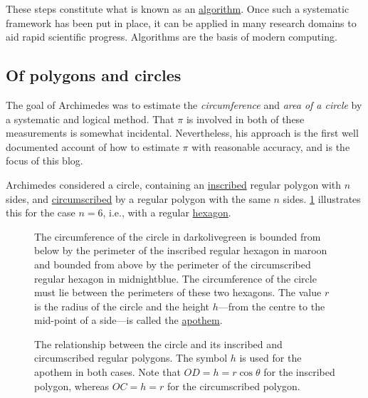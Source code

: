 \documentclass[
  a4paper,
]{article}
\begin{document}
These steps constitute what is known as an
\href{https://www.merriam-webster.com/dictionary/algorithm}{algorithm}.
Once such a systematic framework has been put in place, it can be
applied in many research domains to aid rapid scientific progress.
Algorithms are the basis of modern computing.

\subsection{Of polygons and circles}\label{of-polygons-and-circles}

The goal of Archimedes was to estimate the \emph{circumference} and
\emph{area of a circle} by a systematic and logical method. That \(\pi\)
is involved in both of these measurements is somewhat incidental.
Nevertheless, his approach is the first well documented account of how
to estimate \(\pi\) with reasonable accuracy, and is the focus of this
blog.

Archimedes considered a circle, containing an
\href{https://mathworld.wolfram.com/Inscribed.html}{inscribed} regular
polygon with \(n\) sides, and
\href{https://mathworld.wolfram.com/Circumscribed.html}{circumscribed}
by a regular polygon with the same \(n\) sides. \cref{fig:two-limits}
illustrates this for the case \(n = 6\), i.e., with a regular
\href{https://www.britannica.com/science/hexagon}{hexagon}.

\begin{figure}
\centering

\caption{The circumference of the circle in darkolivegreen is bounded
from below by the perimeter of the inscribed regular hexagon in maroon
and bounded from above by the perimeter of the circumscribed regular
hexagon in midnightblue. The circumference of the circle must lie
between the perimeters of these two hexagons. The value \(r\) is the
radius of the circle and the height \(h\)---from the centre to the
mid-point of a side---is called the
\href{https://en.wikipedia.org/wiki/Apothem}{apothem}.}\label{fig:two-limits}
\end{figure}

\begin{figure}
\centering

\caption[The relationship between the circle and its inscribed and
circumscribed regular polygons. The symbol \(h\) is used for the apothem
in both cases. Note that \(OD = h = r\cos\theta\) for the inscribed
polygon, whereas \(OC = h = r\) for the circumscribed polygon.]{The
relationship between the circle and its inscribed and circumscribed
regular polygons. The symbol \(h\) is used for the apothem in both
cases. Note that \(OD = h = r\cos\theta\) for the inscribed polygon,
whereas \(OC = h = r\) for the circumscribed
polygon.\footnotemark{}}\label{fig:sin-theta-tan-theta}
\end{figure}
\end{document}
